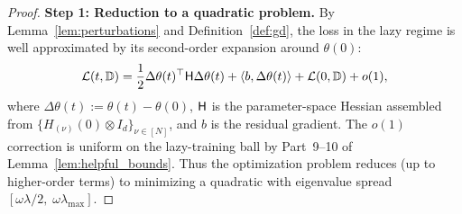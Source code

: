 \documentclass[11pt]{article}
\theoremstyle{plain}
\begin{document}
\begin{proof}
    \textbf{Step 1: Reduction to a quadratic problem.} By Lemma~\ref{lem:perturbations} and Definition~\ref{def:gd}, the loss in the lazy regime is well approximated by its second-order expansion around $\theta(0)$:
    \begin{align*}
        {\cal L}(t,\mathbb{D}) = \frac{1}{2}\Delta\theta(t)^\top {\sf H} \Delta\theta(t) + \langle b, \Delta\theta(t)\rangle + {\cal L}(0, \mathbb{D}) + o(1),
    \end{align*}
    where $\Delta\theta(t) := \theta(t)-\theta(0)$, ${\sf H}$ is the parameter-space Hessian assembled from $\{H_{(\nu)}(0)\otimes I_d\}_{\nu\in[N]}$, and $b$ is the residual gradient. The $o(1)$ correction is uniform on the lazy-training ball by Part~9--10 of Lemma~\ref{lem:helpful_bounds}. Thus the optimization problem reduces (up to higher-order terms) to minimizing a quadratic with eigenvalue spread $[\omega\lambda/2,\;\omega\lambda_{\max}]$.


\end{proof}
\end{document}
